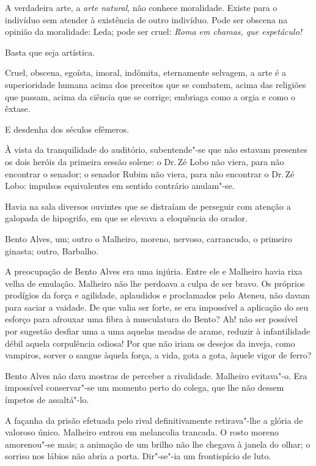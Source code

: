 A verdadeira arte, a \textit{arte natural}, não conhece
moralidade. Existe para o indivíduo sem atender à existência de outro
indivíduo. Pode ser obscena na opinião da moralidade: Leda; pode ser
cruel: \textit{Roma em chamas, que espetáculo!} 

Basta que seja artística. 

Cruel, obscena, egoísta, imoral, indômita, eternamente selvagem, a arte é a
superioridade humana acima dos preceitos que se combatem, acima das
religiões que passam, acima da ciência que se corrige; embriaga como a
orgia e como o êxtase. 

E desdenha dos séculos efêmeros. 

\noindent\dotfill

À vista da tranquilidade do auditório, subentende"-se que não estavam presentes
os dois heróis da primeira sessão solene: o Dr.\,Zé Lobo não viera, para
não encontrar o senador; o senador Rubim não viera, para não encontrar
o Dr.\,Zé Lobo: impulsos equivalentes em sentido contrário anulam"-se.

Havia na sala diversos ouvintes que se distraíam de perseguir com
atenção a galopada de hipogrifo, em que se elevava a eloquência do
orador. 

Bento Alves, um; outro o Malheiro, moreno, nervoso, carrancudo,
o primeiro ginasta; outro, Barbalho. 

A preocupação de Bento Alves era
uma injúria. Entre ele e Malheiro havia rixa velha de emulação.
Malheiro não lhe perdoava a culpa de ser bravo. Os próprios prodígios
da força e agilidade, aplaudidos e proclamados pelo Ateneu, não davam
para saciar a vaidade. De que valia ser forte, se era impossível a
aplicação do seu esforço para afrouxar uma fibra à musculatura do
Bento? Ah! não ser possível por sugestão desfiar uma a uma aquelas
meadas de arame, reduzir à infantilidade débil aquela corpulência
odiosa! Por que não iriam os desejos da inveja, como vampiros, sorver o
sangue àquela força, a vida, gota a gota, àquele vigor de ferro? 

Bento Alves não dava mostras de perceber a rivalidade. Malheiro evitava"-o.
Era impossível conservar"-se um momento perto do colega, que lhe não
dessem ímpetos de assaltá"-lo. 

A façanha da prisão efetuada pelo rival
definitivamente retirava"-lhe a glória de valoroso único. Malheiro
entrou em melancolia trancada. O rosto moreno amorenou"-se mais; a
animação de um brilho não lhe chegava à janela do olhar; o sorriso nos
lábios não abria a porta. Dir"-se"-ia um frontispício de luto. 

